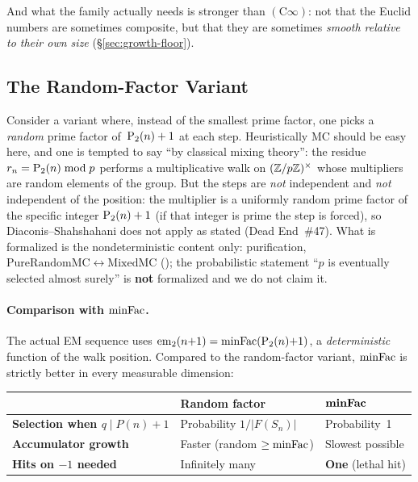 \smallskip\noindent
And what the family actually needs is stronger than $(\mathrm{C}\infty)$:
not that the Euclid numbers are sometimes composite, but that they are
sometimes \emph{smooth relative to their own size}
(\S\ref{sec:growth-floor}).

\subsection{The Random-Factor Variant}
\label{sec:random-variant}

Consider a variant where, instead of the smallest prime factor, one
picks a \emph{random} prime factor of~$\mathrm{P}_{2}(n)+1$ at each step.
Heuristically MC should be easy here, and one is tempted to say ``by
classical mixing theory'': the residue $r_n = \mathrm{P}_{2}(n) \bmod p$
performs a multiplicative walk on $(\mathbb{Z}/p\mathbb{Z})^\times$ whose multipliers
are random elements of the group.  But the steps are \emph{not}
independent and \emph{not} independent of the position: the multiplier is
a uniformly random prime factor of the specific integer
$\mathrm{P}_{2}(n)+1$ (if that integer is prime the step is forced), so
Diaconis--Shahshahani does not apply as stated (Dead End~\#47).  What is
formalized is the nondeterministic content only: purification,
$\mathrm{PureRandomMC} \leftrightarrow \mathrm{MixedMC}$
(); the probabilistic statement
``$p$ is eventually selected almost surely'' is \textbf{not} formalized
and we do not claim it.

\paragraph{Comparison with $\mathrm{minFac}$.}
The actual EM sequence uses
$\mathrm{em}_{2}(n{+}1) = \mathrm{minFac}(\mathrm{P}_{2}(n){+}1)$, a \emph{deterministic}
function of the walk position.  Compared to the random-factor variant,
$\mathrm{minFac}$ is strictly better in every measurable dimension:

\smallskip
\begin{center}
\begin{tabular}{l@{\quad}l@{\quad}l}
\toprule
 & \textbf{Random factor} & $\boldsymbol{\mathrm{minFac}}$ \\
\midrule
\textbf{Selection when $q \mid P(n){+}1$}
  & Probability $1/|F(S_n)|$ & Probability~1 \\
\textbf{Accumulator growth}
  & Faster (random $\geq \mathrm{minFac}$) & Slowest possible \\
\textbf{Hits on $-1$ needed}
  & Infinitely many & \textbf{One} (lethal hit) \\
\bottomrule
\end{tabular}
\end{center}

